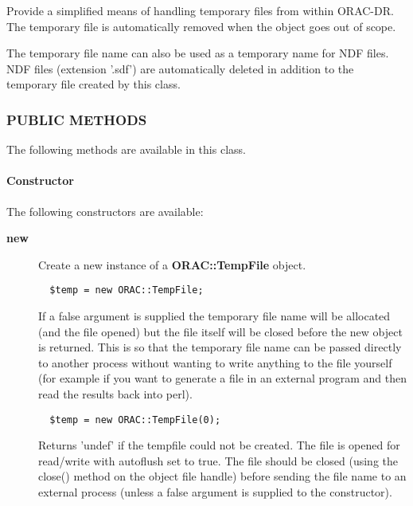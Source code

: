 \begin{description}
Provide a simplified means of handling temporary files from within
ORAC-DR. The temporary file is automatically removed when the
object goes out of scope.



The temporary file name can also be used as a temporary name for
NDF files. NDF files (extension '.sdf') are automatically deleted
in addition to the temporary file created by this class.

\subsubsection*{PUBLIC METHODS\label{ORAC::TempFile_PUBLIC_METHODS}}


The following methods are available in this class.

\paragraph*{Constructor\label{ORAC::TempFile_Constructor}}


The following constructors are available:

\begin{description}

\item[{\textbf{new}}] \mbox{}

Create a new instance of a \textbf{ORAC::TempFile} object.

\begin{verbatim}
  $temp = new ORAC::TempFile;
\end{verbatim}


If a false argument is supplied the temporary file
name will be allocated (and the file opened) but the 
file itself will be closed before the new object is returned.
This is so that the temporary file name can be passed directly
to another process without wanting to write anything to the
file yourself (for example if you want to generate a file
in an external program and then read the results back into
perl).

\begin{verbatim}
  $temp = new ORAC::TempFile(0);
\end{verbatim}


Returns 'undef' if the tempfile could not be created.
The file is opened for read/write with autoflush set to true.
The file should be closed (using the close() method on the
object file handle) before sending the file name to an external
process (unless a false argument is supplied to the constructor).


\end{description}
\end{description}
